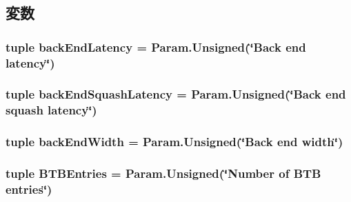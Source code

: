 \subsection{変数}
\hypertarget{classOzoneCPU_1_1DerivOzoneCPU_a76161b8251998574b56e2dfefcb5f4ff}{
\subsubsection[{backEndLatency}]{\setlength{\rightskip}{0pt plus 5cm}tuple {\bf backEndLatency} = Param.Unsigned(\char`\"{}Back end latency\char`\"{})}}
\label{classOzoneCPU_1_1DerivOzoneCPU_a76161b8251998574b56e2dfefcb5f4ff}
\hypertarget{classOzoneCPU_1_1DerivOzoneCPU_a4237ef2911b088ae0e216acaf38de161}{
\subsubsection[{backEndSquashLatency}]{\setlength{\rightskip}{0pt plus 5cm}tuple {\bf backEndSquashLatency} = Param.Unsigned(\char`\"{}Back end squash latency\char`\"{})}}
\label{classOzoneCPU_1_1DerivOzoneCPU_a4237ef2911b088ae0e216acaf38de161}
\hypertarget{classOzoneCPU_1_1DerivOzoneCPU_acda01682639f669f22b3de5631db15a8}{
\subsubsection[{backEndWidth}]{\setlength{\rightskip}{0pt plus 5cm}tuple {\bf backEndWidth} = Param.Unsigned(\char`\"{}Back end {\bf width}\char`\"{})}}
\label{classOzoneCPU_1_1DerivOzoneCPU_acda01682639f669f22b3de5631db15a8}
\hypertarget{classOzoneCPU_1_1DerivOzoneCPU_af08b7bde310be401d556775d6f7022c8}{
\subsubsection[{BTBEntries}]{\setlength{\rightskip}{0pt plus 5cm}tuple {\bf BTBEntries} = Param.Unsigned(\char`\"{}Number of BTB entries\char`\"{})}}
